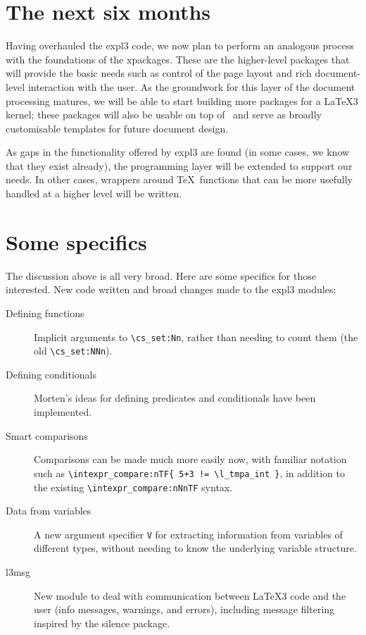 \documentclass{ltnews}
\begin{document}
\section{The next six months}

Having overhauled the \textsf{expl3} code, we now plan to perform an
analogous process with the foundations of the
\textsf{xpackages}. These are the higher-level packages that will
provide the basic needs such as control of the page layout and rich
document-level interaction with the user. As the groundwork for this
layer of the document processing matures, we will be able to start
building more packages for a \LaTeX3 kernel; these packages will also
be usable on top of \LaTeXe\ and serve as broadly customisable
templates for future document design.

As gaps in the functionality offered by \textsf{expl3} are found (in
some cases, we know that they exist already), the programming layer
will be extended to support our needs. In other cases, wrappers around
\TeX\ functions that can be more usefully handled at a higher level
will be written.

\section{Some specifics}

The discussion above is all very broad. Here are some specifics for
those interested. New code written and broad changes made to the
\textsf{expl3} modules:
\begin{description}
\item [Defining functions] Implicit arguments to \verb|\cs_set:Nn|,
  rather than needing to count them (the old \verb|\cs_set:NNn|).
\item [Defining conditionals] Morten's ideas for defining predicates 
  and conditionals have been implemented.
\item [Smart comparisons] Comparisons can be made much more easily
  now, with familiar notation such as 
  \verb|\intexpr_compare:nTF{ 5+3 != \l_tmpa_int }|, in addition to
  the existing \verb|\intexpr_compare:nNnTF| syntax.
\item [Data from variables] A new argument specifier \texttt{V} 
  for extracting information from variables of different types, 
  without needing to know the underlying variable structure.
\item [l3msg] New module to deal with communication between \LaTeX3 
  code and the user (info messages, warnings, and errors), including
  message filtering inspired by the \textsf{silence} package.
\end{description}
\end{document}
